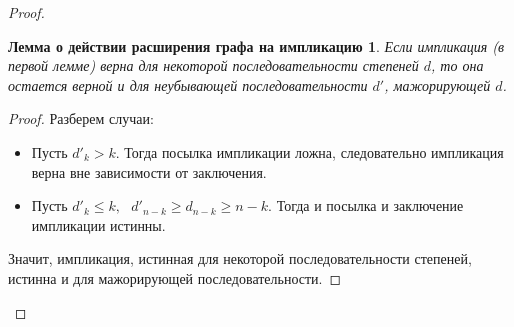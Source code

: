 \documentclass[10pt,a4paper]{article}
\begin{document}
\begin{enumerate}
\begin{proof}
	\newtheorem*{lemma4}{Лемма о действии расширения графа на импликацию}
	\begin{lemma4}
	Если импликация (в первой лемме) верна для некоторой последовательности степеней $d$, то она остается верной и для неубывающей последовательности $d'$, мажорирующей $d$. 
	\end{lemma4}
	\begin{proof} Разберем случаи: \\
	\begin{itemize}
	\item Пусть $d'_k > k$. Тогда посылка импликации ложна, следовательно импликация верна вне зависимости от заключения.
	\item Пусть $d'_k \leq k, \mbox{ } d'_{n - k} \geq d_{n - k} \geq n - k$. Тогда и посылка и заключение импликации истинны.
	\end{itemize}
	Значит, импликация, истинная для некоторой последовательности степеней, истинна и для мажорирующей последовательности. \qedhere
	\end{proof}
	

\end{proof}
\end{enumerate}
\end{document}
